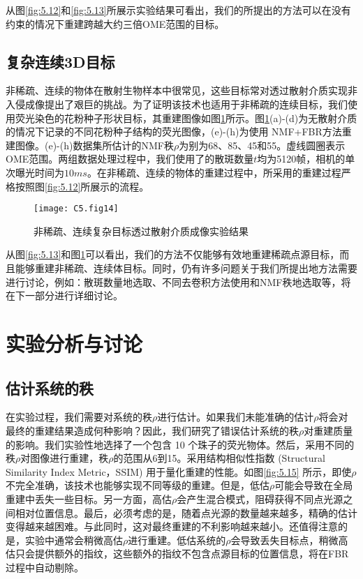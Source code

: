 从图\ref{fig:5.12}和\ref{fig:5.13}所展示实验结果可看出，我们的所提出的方法可以在没有约束的情况下重建跨越大约三倍OME范围的目标。

\subsection{复杂连续3D目标}

非稀疏、连续的物体在散射生物样本中很常见，这些目标常对透过散射介质实现非入侵成像提出了艰巨的挑战。为了证明该技术也适用于非稀疏的连续目标，我们使用荧光染色的花粉种子形状目标，其重建图像如图\ref{fig:5.14}所示。图\ref{fig:5.14}(a)-(d)为无散射介质的情况下记录的不同花粉种子结构的荧光图像，(e)-(h)为使用 NMF+FBR方法重建图像。(e)-(h)数据集所估计的NMF秩$\rho$为别为68、85、45和55。虚线圆圈表示OME范围。两组数据处理过程中，我们使用了的散斑数量$t$均为5120帧，相机的单次曝光时间为$10 ms$。在非稀疏、连续的物体的重建过程中，所采用的重建过程严格按照图\ref{fig:5.12}所展示的流程。

\begin{figure}[htp]
	\centering
	\texttt{[image: C5.fig14]}
	\caption{非稀疏、连续复杂目标透过散射介质成像实验结果}
	\label{fig:5.14}
\end{figure}

从图\ref{fig:5.13}和图\ref{fig:5.14}可以看出，我们的方法不仅能够有效地重建稀疏点源目标，而且能够重建非稀疏、连续体目标。同时，仍有许多问题关于我们所提出地方法需要进行讨论，例如：散斑数量地选取、不同去卷积方法使用和NMF秩地选取等，将在下一部分进行详细讨论。

\section{实验分析与讨论}

\subsection{估计系统的秩}
在实验过程，我们需要对系统的秩$\rho$进行估计。如果我们未能准确的估计$\rho$将会对最终的重建结果造成何种影响？因此，我们研究了错误估计系统的秩$\rho$对重建质量的影响。我们实验性地选择了一个包含 10 个珠子的荧光物体。然后，采用不同的秩$\rho$对图像进行重建，秩$\rho$的范围从6到15。采用结构相似性指数 (Structural Similarity Index Metric，SSIM) \cite{Daoud2017} 用于量化重建的性能。如图\ref{fig:5.15} 所示，即使$\rho$不完全准确，该技术也能够实现不同等级的重建。但是，低估$\rho$可能会导致在全局重建中丢失一些目标。另一方面，高估$\rho$会产生混合模式，阻碍获得不同点光源之间相对位置信息。最后，必须考虑的是，随着点光源的数量越来越多，精确的估计变得越来越困难。与此同时，这对最终重建的不利影响越来越小。还值得注意的是，实验中通常会稍微高估$\rho$进行重建。低估系统的$\rho$会导致丢失目标点，稍微高估只会提供额外的指纹，这些额外的指纹不包含点源目标的位置信息，将在FBR过程中自动剔除。

